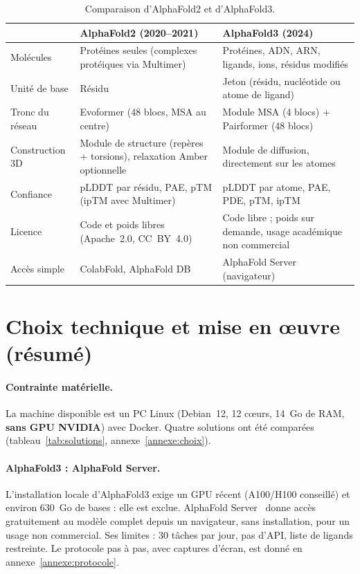 \begin{table}[htbp]
\centering
\footnotesize
\begin{tabularx}{\textwidth}{>{\raggedright\arraybackslash}p{3cm}>{\raggedright\arraybackslash}X>{\raggedright\arraybackslash}X}
\toprule
 & \textbf{AlphaFold2 (2020--2021)} & \textbf{AlphaFold3 (2024)} \\
\midrule
Molécules & Protéines seules (complexes protéiques via Multimer) & Protéines, ADN, ARN, ligands, ions, résidus modifiés \\
Unité de base & Résidu & Jeton (résidu, nucléotide ou atome de ligand) \\
Tronc du réseau & Evoformer (48 blocs, MSA au centre) & Module MSA (4 blocs) + Pairformer (48 blocs) \\
Construction 3D & Module de structure (repères + torsions), relaxation Amber optionnelle & Module de diffusion, directement sur les atomes \\
Confiance & pLDDT par résidu, PAE, pTM (ipTM avec Multimer) & pLDDT par atome, PAE, PDE, pTM, ipTM \\
Licence & Code et poids libres (Apache~2.0, CC~BY~4.0) & Code libre ; poids sur demande, usage académique non commercial \\
Accès simple & ColabFold, AlphaFold DB & AlphaFold Server (navigateur) \\
\bottomrule
\end{tabularx}
\caption{Comparaison d'AlphaFold2 et d'AlphaFold3.}
\label{tab:af2_af3}
\end{table}

\section{Choix technique et mise en œuvre (résumé)}
\label{sec:choix}

\paragraph{Contrainte matérielle.} La machine disponible est un PC Linux (Debian~12, 12 cœurs, 14~Go de RAM, \textbf{sans GPU NVIDIA}) avec Docker. Quatre solutions ont été comparées (tableau~\ref{tab:solutions}, annexe~\ref{annexe:choix}).

\paragraph{AlphaFold3 : AlphaFold Server.} L'installation locale d'AlphaFold3 exige un GPU récent (A100/H100 conseillé) et environ 630~Go de bases : elle est exclue. AlphaFold Server~\cite{alphafold_server} donne accès gratuitement au modèle complet depuis un navigateur, sans installation, pour un usage non commercial. Ses limites : 30 tâches par jour, pas d'API, liste de ligands restreinte. Le protocole pas à pas, avec captures d'écran, est donné en annexe~\ref{annexe:protocole}.

